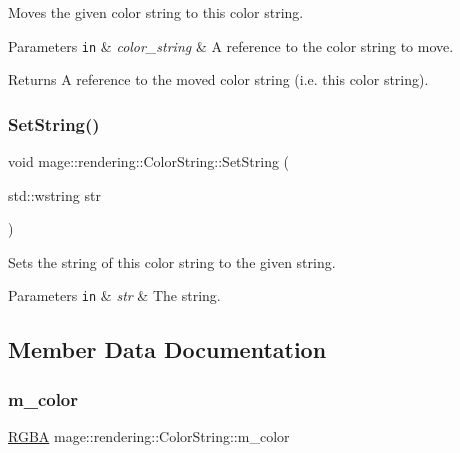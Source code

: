 Moves the given color string to this color string.


\begin{DoxyParams}[1]{Parameters}
\mbox{\tt in}  & {\em color\+\_\+string} & A reference to the color string to move. \\
\hline
\end{DoxyParams}
\begin{DoxyReturn}{Returns}
A reference to the moved color string (i.\+e. this color string). 
\end{DoxyReturn}
\mbox{\label{classmage_1_1rendering_1_1_color_string_a3f5139de7675dc21f4f444fae8a1983d}} 
\subsubsection{\texorpdfstring{Set\+String()}{SetString()}}
{\footnotesize\ttfamily void mage\+::rendering\+::\+Color\+String\+::\+Set\+String (\begin{DoxyParamCaption}\item[{std\+::wstring}]{str }\end{DoxyParamCaption})\hspace{0.3cm}{\ttfamily [noexcept]}}

Sets the string of this color string to the given string.


\begin{DoxyParams}[1]{Parameters}
\mbox{\tt in}  & {\em str} & The string. \\
\hline
\end{DoxyParams}


\subsection{Member Data Documentation}
\mbox{\label{classmage_1_1rendering_1_1_color_string_a6b062bfa44b3786c5e8f2e8d18a373ca}} 
\subsubsection{\texorpdfstring{m\+\_\+color}{m\_color}}
{\footnotesize\ttfamily \mbox{\hyperlink{structmage_1_1_r_g_b_a}{R\+G\+BA}} mage\+::rendering\+::\+Color\+String\+::m\+\_\+color\hspace{0.3cm}{\ttfamily [private]}}

